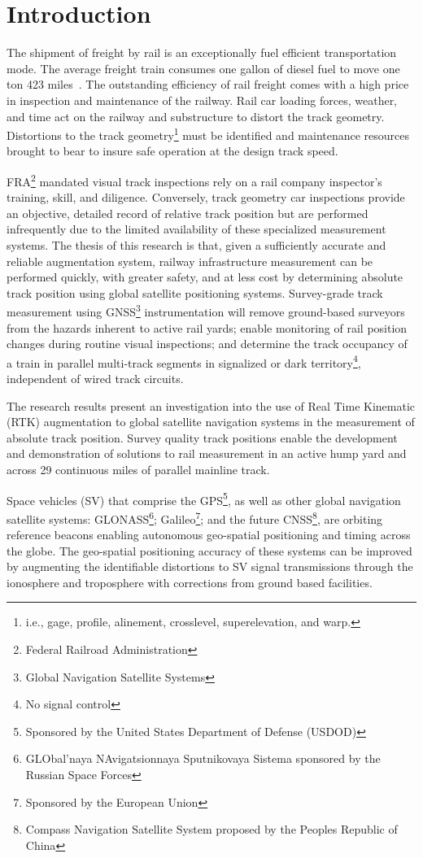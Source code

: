\chapter{Introduction}
The shipment of freight by rail is an exceptionally fuel efficient transportation mode. The average freight train consumes one gallon of diesel fuel to move one ton 423 miles~\citep{RITAtransStats08}. The outstanding efficiency of rail freight comes with a high price in inspection and maintenance of the railway. Rail car loading forces, weather, and time act on the railway and substructure to distort the track geometry. Distortions to the track geometry\footnote{i.e., gage, profile, alinement, crosslevel, superelevation, and warp.} must be identified and maintenance resources brought to bear to insure safe operation at the design track speed. 

FRA\footnote{Federal Railroad Administration} mandated visual track inspections rely on a rail company inspector's training, skill, and diligence. Conversely, track geometry car inspections provide an objective, detailed record of relative track position but are performed infrequently due to the limited availability of these specialized measurement systems. The thesis of this research is that, given a sufficiently accurate and reliable augmentation system, railway infrastructure measurement can be performed quickly, with greater safety, and at less cost by determining absolute track position using global satellite positioning systems. Survey-grade track measurement using GNSS\footnote{Global Navigation Satellite Systems} instrumentation will remove ground-based surveyors from the hazards inherent to active rail yards; enable monitoring of rail position changes during routine visual inspections; and determine the track occupancy of a train in parallel multi-track segments in signalized or dark territory\footnote{No signal control}, independent of wired track circuits.

The research results present an investigation into the use of Real Time Kinematic (RTK) augmentation to global satellite navigation systems in the measurement of absolute track position. Survey quality track positions enable the development and demonstration of solutions to rail measurement in an active hump yard and across 29 continuous miles of parallel mainline track.

Space vehicles (SV) that comprise the GPS\footnote{Sponsored by the United States Department of Defense (USDOD)}, as well as other global navigation satellite systems: GLONASS\footnote{GLObal'naya NAvigatsionnaya Sputnikovaya Sistema  sponsored by the Russian Space Forces}; Galileo\footnote{Sponsored by the European Union}; and the future CNSS\footnote{Compass Navigation Satellite System proposed by the Peoples Republic of China}, are orbiting reference beacons enabling autonomous geo-spatial positioning and timing across the globe. The geo-spatial positioning accuracy of these systems can be improved by augmenting the identifiable distortions to SV signal transmissions through the ionosphere and troposphere with corrections from ground based facilities. 

